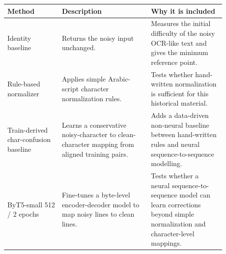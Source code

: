 \begin{tabular}{p{0.22\linewidth}p{0.36\linewidth}p{0.30\linewidth}}
\toprule
Method & Description & Why it is included \\
\midrule
Identity baseline & Returns the noisy input unchanged. & Measures the initial difficulty of the noisy OCR-like text and gives the minimum reference point. \\
Rule-based normalizer & Applies simple Arabic-script character normalization rules. & Tests whether hand-written normalization is sufficient for this historical material. \\
Train-derived char-confusion baseline & Learns a conservative noisy-character to clean-character mapping from aligned training pairs. & Adds a data-driven non-neural baseline between hand-written rules and neural sequence-to-sequence modelling. \\
ByT5-small 512 / 2 epochs & Fine-tunes a byte-level encoder-decoder model to map noisy lines to clean lines. & Tests whether a neural sequence-to-sequence model can learn corrections beyond simple normalization and character-level mappings. \\
\bottomrule
\end{tabular}
